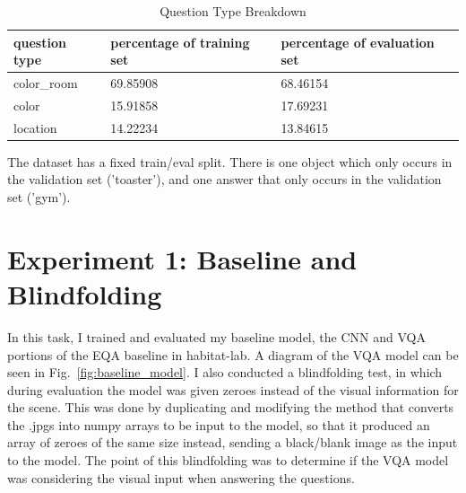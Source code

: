 \begin{table}[h]
\centering
\caption{Question Type Breakdown}
\begin{tabular}{ |l|l|l| }
\hline
\textbf{question type} & \textbf{percentage of training set} & \textbf{percentage of evaluation set} \\
\hline
color\_room & 69.85908 & 68.46154\\
color & 15.91858 & 17.69231\\
location & 14.22234 & 13.84615\\
\hline
\end{tabular}
\label{tab:q_breakdown}
\end{table}

The dataset has a fixed train/eval split. There is one object which only occurs in the validation set ('toaster'), and one answer that only occurs in the validation set ('gym'). 



\section{Experiment 1: Baseline and Blindfolding}
\label{sec:exp_1}
In this task, I trained and evaluated my baseline model, the CNN and VQA portions of the EQA baseline in habitat-lab. A diagram of the VQA model can be seen in Fig.~\ref{fig:baseline_model}. I also conducted a blindfolding test, in which during evaluation the model was given zeroes instead of the visual information for the scene. This was done by duplicating and modifying the method that converts the .jpgs into numpy arrays to be input to the model, so that it produced an array of zeroes of the same size instead, sending a black/blank image as the input to the model. The point of this blindfolding was to determine if the VQA model was considering the visual input when answering the questions. 


